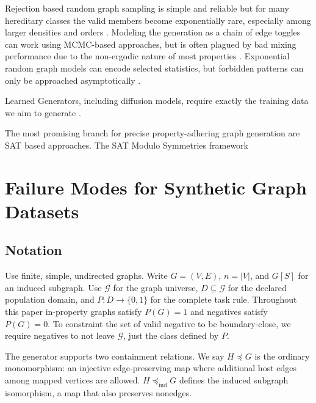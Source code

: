\documentclass[11pt,twocolumn]{article}
\newcommand{\subg}{\preccurlyeq}
\newcommand{\subgind}{\preccurlyeq_{\mathrm{ind}}}
\begin{document}
Rejection based random graph sampling is simple and reliable but for many hereditary classes the valid members become exponentially rare, especially among larger densities and orders \cite{friezeIntroductionRandomGraphs2015}.
Modeling the generation as a chain of edge toggles can work using MCMC-based approaches, but is often plagued by bad mixing performance due to the non-ergodic nature of most properties \cite{taoImprovedMCMCAlgorithm2016}. %
Exponential random graph models can encode selected statistics, but forbidden patterns can only be approached asymptotically \cite{buttsPerfectSamplingMethod2018}.

Learned Generators, including diffusion models, require exactly the training data we aim to generate \cite{vignacDiGressDiscreteDenoising2023}.


The most promising branch for precise property-adhering graph generation are SAT based approaches.
The SAT Modulo Symmetries framework 
\cite{kirchwegerSATModuloSymmetries2024, janotaBreakingSymmetriesQuantified2025, kirchwegerSATBasedGenerationPlanar2023, kirchwegerCoCertificateLearningSAT2023}


\section{Failure Modes for Synthetic Graph Datasets}\label{sec:failures}

\subsection{Notation}

Use finite, simple, undirected graphs. Write $G=(V,E)$, $n=|V|$, and $G[S]$ for an induced subgraph. Use $\mathcal G$ for the graph universe, $D\subseteq\mathcal G$ for the declared population domain, and $P:D\to\{0,1\}$ for the complete task rule.
Throughout this paper in-property graphs satisfy $P(G)=1$ and negatives satisfy $P(G)=0$.
To constraint the set of valid negative to be boundary-close, we require negatives to not leave $\mathcal{G}$, just the class defined by $P$.

The generator supports two containment relations. We say $H \subg G$ is the ordinary monomorphism: an injective edge-preserving map where additional host edges among mapped vertices are allowed. $H \subgind G$ defines the induced subgraph isomorphism, a map that also preserves nonedges.
\end{document}
